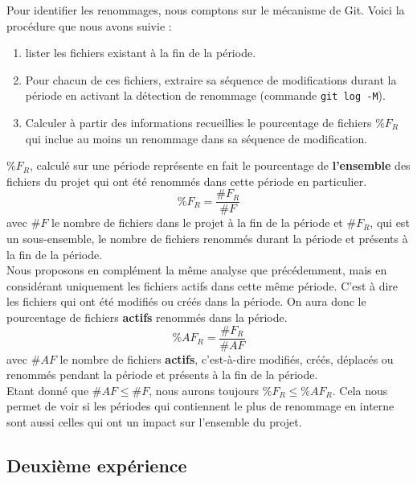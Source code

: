 Pour identifier les renommages, nous comptons sur le mécanisme de Git. Voici la procédure que nous avons suivie :
\begin{enumerate}
\item lister les fichiers existant à la fin de la période.
\item Pour chacun de ces fichiers, extraire sa séquence de modifications durant la période en activant la détection de renommage (commande \texttt{git log -M}).
\item Calculer à partir des informations recueillies le pourcentage de fichiers $\%F_{R}$ qui inclue au moins un renommage dans sa séquence de modification.
\end{enumerate}
\medskip

$\%F_{R}$, calculé sur une période représente en fait le pourcentage de \textbf{l'ensemble} des fichiers du projet qui ont été renommés dans cette période en particulier. \[\%F_{R} = \frac{\#F_{R}}{\#F}\] avec $\#F$ le nombre de fichiers dans le projet à la fin de la période et $\#F_{R}$, qui est un sous-ensemble, le nombre de fichiers renommés durant la période et présents à la fin de la période.\\

Nous proposons en complément la même analyse que précédemment, mais en considérant uniquement les fichiers actifs dans cette même période. C'est à dire les fichiers qui ont été modifiés ou créés dans la période. On aura donc le pourcentage de fichiers \textbf{actifs} renommés dans la période. 
\[\%AF_{R} = \frac{\#F_{R}}{\#AF}\] avec $\#AF$ le nombre de fichiers \textbf{actifs}, c'est-à-dire modifiés, créés, déplacés ou renommés pendant la période et présents à la fin de la période.\\

Etant donné que ${\#AF} \le {\#F}$, nous aurons toujours $\%F_{R} \le \%AF_{R}$. Cela nous permet de voir si les périodes qui contiennent le plus de renommage en interne sont aussi celles qui ont un impact sur l'ensemble du projet.\\


\subsection{Deuxième expérience}

